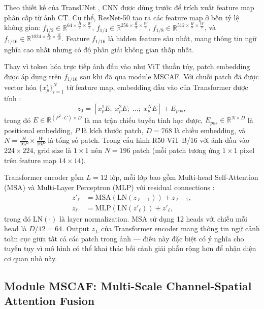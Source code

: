 \documentclass[10pt,a4paper]{article}
\begin{document}
Theo thiết kế của TransUNet \cite{chen2021transunet}, CNN được dùng trước để trích xuất feature map phân cấp từ ảnh CT. Cụ thể, ResNet-50 \cite{he2016resnet} tạo ra các feature map ở bốn tỷ lệ không gian: $f_{1/2} \in \mathbb{R}^{64 \times \frac{H}{2} \times \frac{W}{2}}$, $f_{1/4} \in \mathbb{R}^{256 \times \frac{H}{4} \times \frac{W}{4}}$, $f_{1/8} \in \mathbb{R}^{512 \times \frac{H}{8} \times \frac{W}{8}}$, và $f_{1/16} \in \mathbb{R}^{1024 \times \frac{H}{16} \times \frac{W}{16}}$. Feature $f_{1/16}$ là hidden feature sâu nhất, mang thông tin ngữ nghĩa cao nhất nhưng có độ phân giải không gian thấp nhất.

Thay vì token hóa trực tiếp ảnh đầu vào như ViT thuần túy, patch embedding được áp dụng trên $f_{1/16}$ sau khi đã qua module MSCAF. Với chuỗi patch đã được vector hóa $\{x_p^i\}_{i=1}^{N}$ từ feature map, embedding đầu vào của Transformer được tính \cite{dosovitskiy2021vit,chen2021transunet}:
\begin{equation}
    z_0 = [x_p^1 E;\; x_p^2 E;\; \ldots;\; x_p^N E] + E_{pos},
    \label{eq:patch-embedding}
\end{equation}
trong đó $E \in \mathbb{R}^{(P^2 \cdot C) \times D}$ là ma trận chiếu tuyến tính học được, $E_{pos} \in \mathbb{R}^{N \times D}$ là positional embedding, $P$ là kích thước patch, $D=768$ là chiều embedding, và $N = \frac{H}{16P} \times \frac{W}{16P}$ là tổng số patch. Trong cấu hình R50-ViT-B/16 với ảnh đầu vào $224 \times 224$, grid size là $1 \times 1$ nên $N = 196$ patch (mỗi patch tương ứng $1 \times 1$ pixel trên feature map $14 \times 14$).

Transformer encoder gồm $L=12$ lớp, mỗi lớp bao gồm Multi-head Self-Attention (MSA) và Multi-Layer Perceptron (MLP) với residual connections \cite{vaswani2017attention,dosovitskiy2021vit}:
\begin{align}
    z'_\ell &= \text{MSA}(\text{LN}(z_{\ell-1})) + z_{\ell-1}, \label{eq:msa}\\
    z_\ell &= \text{MLP}(\text{LN}(z'_\ell)) + z'_\ell, \label{eq:mlp}
\end{align}
trong đó $\text{LN}(\cdot)$ là layer normalization. MSA sử dụng 12 heads với chiều mỗi head là $D/12 = 64$. Output $z_L$ của Transformer encoder mang thông tin ngữ cảnh toàn cục giữa tất cả các patch trong ảnh --- điều này đặc biệt có ý nghĩa cho tuyến tụy vì mô hình có thể khai thác bối cảnh giải phẫu rộng hơn để nhận diện cơ quan nhỏ này.

\subsection{Module MSCAF: Multi-Scale Channel-Spatial Attention Fusion}
\end{document}
